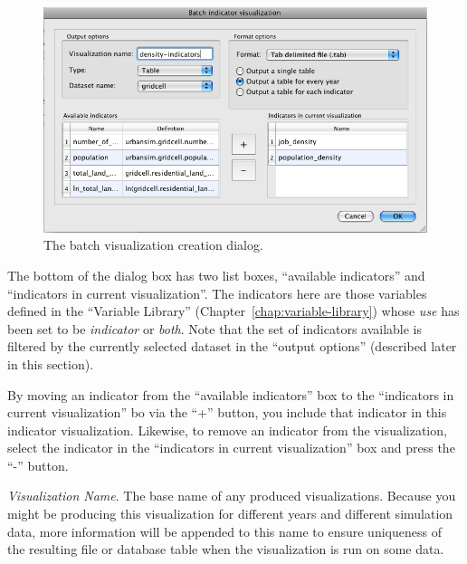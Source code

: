 \begin{figure}[tph]
\begin{center}
\includegraphics[width=\textwidth]{part-gui/images/result-manager-batch-viz-config.png}
\end{center}
\caption{The batch visualization creation dialog.}
\label{fig:results-manager-batch-viz}
\end{figure}


The bottom of the dialog box has two list boxes,  ``available
indicators'' and  ``indicators in current visualization''. The
indicators here are those variables defined in the 
``Variable Library'' (Chapter~\ref{chap:variable-library}) whose
\emph{use} has been set to be \emph{indicator} or \emph{both}. Note that the set of
indicators available is filtered by the currently selected dataset in
the  ``output options'' (described later in this section).

By moving an indicator from the  ``available indicators'' box to the
 ``indicators in current visualization'' bo via the  ``+'' button, you
include that indicator in this indicator visualization. Likewise, to
remove an indicator from the visualization, select the indicator in
the  ``indicators in current visualization'' box and press the  ``-''
button.



\emph{Visualization Name}. The base name of any produced
visualizations. Because you might be producing this visualization for
different years and different simulation data, more information will
be appended to this name to ensure uniqueness of the resulting file
or database table when the visualization is run on some data. 

